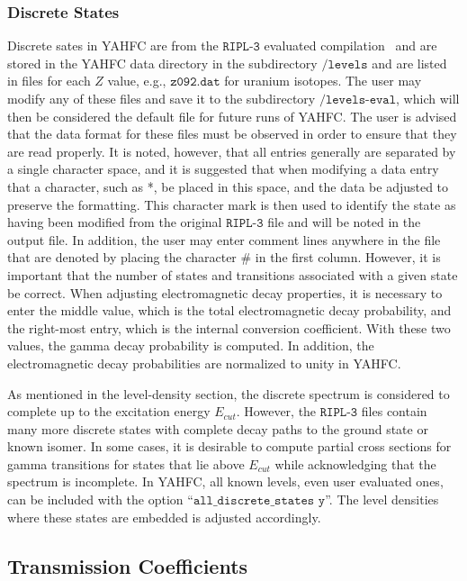 \documentclass[
10pt,
showpacs,preprintnumbers,footinbib,
amsfonts,amsmath,amssymb,
aps,
prc,twocolumn,groupedaddress,superscriptaddress,
showkeys,
nofootinbib
]{revtex4-1}
\begin{document}
\subsubsection{Discrete States}

Discrete sates in YAHFC are from the ${\texttt{RIPL-3}}$ evaluated compilation~\cite{Capote:2009,RIPL-3} and are stored in the YAHFC data directory in the subdirectory ${\texttt{/levels}}$ and are listed in files for each $Z$ value, e.g., ${\texttt{z092.dat}}$ for uranium isotopes. The user may modify any of these files and save it to the subdirectory ${\texttt{/levels-eval}}$, which will then be considered the default file for future runs of YAHFC. The user is advised that the data format for these files must be observed in order to ensure that they are read properly. It is noted, however, that all entries generally are separated by a single character space, and it is suggested that when modifying a data entry that a character, such as *, be placed in this space, and the data be adjusted to preserve the formatting. This character mark is then used to identify the state as having been modified from the original ${\texttt{RIPL-3}}$ file and will be noted in the output file. In addition, the user may enter comment lines anywhere in the file that are denoted by placing the character \# in the first column. However, it is important that the number of states and transitions associated with a given state be correct. When adjusting electromagnetic decay properties, it is necessary to enter the middle value, which is the total electromagnetic decay probability, and the right-most entry, which is the internal conversion coefficient. With these two values, the gamma decay probability is computed. In addition, the electromagnetic decay probabilities are normalized to unity in YAHFC.

As mentioned in the level-density section, the discrete spectrum is considered to complete up to the excitation energy $E_{cut}$. However, the ${\texttt{RIPL-3}}$ files contain many more discrete states with complete decay paths to the ground state or known isomer. In some cases, it is desirable to compute partial cross sections for gamma transitions for states that lie above $E_{cut}$ while acknowledging that the spectrum is incomplete. In YAHFC, all known levels, even user evaluated ones, can be included with the option ``${\texttt{all\_discrete\_states y}}$''. The level densities where these states are embedded is adjusted accordingly.

\subsection{Transmission Coefficients}
\end{document}
